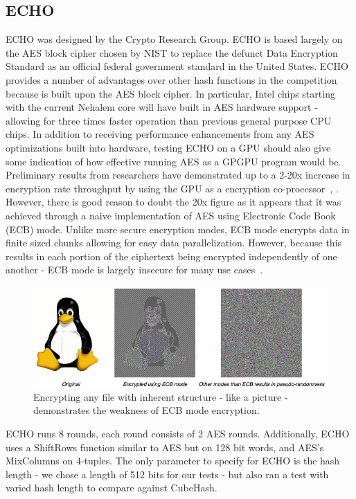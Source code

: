 \subsection*{ECHO}
ECHO was designed by the Crypto Research Group.
ECHO is based largely on the AES block cipher chosen by NIST to replace the defunct Data Encryption Standard as an official federal government standard in the United States.
ECHO provides a number of advantages over other hash functions in the competition because is built upon the AES block cipher.
In particular, Intel chips starting with the current Nehalem core will have built in AES hardware support - allowing for three times faster operation than previous general purpose CPU chips.\cite{Westmere}
In addition to receiving performance enhancements from any AES optimizations built into hardware, testing ECHO on a GPU should also give some indication of how effective running AES as a GPGPU program would be.
Preliminary results from researchers have demonstrated up to a 2-20x increase in encryption rate throughput by using the GPU as a encryption co-processor~\cite{Harrison}, \cite{Manavski}.
However, there is good reason to doubt the 20x figure as it appears that it was achieved through a naive implementation of AES using Electronic Code Book (ECB) mode.
Unlike more secure encryption modes, ECB mode encrypts data in finite sized chunks allowing for easy data parallelization.  
However, because this results in each portion of the ciphertext being encrypted independently of one another - ECB mode is largely insecure for many use cases~\cite{CodeBook}.

\begin{figure}[htp]
\includegraphics[width=\textwidth]{../data/ECB.png}
\caption{Encrypting any file with inherent structure - like a picture - demonstrates the weakness of ECB mode encryption.\cite{CodeBook}}\label{fig:ecb}
\end{figure}

ECHO runs 8 rounds, each round consists of 2 AES rounds.
Additionally, ECHO uses a ShiftRows function similar to AES but on 128 bit words, and AES's MixColumns on 4-tuples.
The only parameter to specify for ECHO is the hash length - we chose a length of 512 bits for our tests - but also ran a test with varied hash length to compare against CubeHash.

